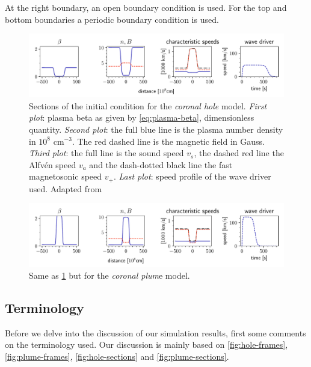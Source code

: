 At the right boundary, an open boundary condition is used. For the top and bottom boundaries a periodic boundary condition is used.

\begin{figure}[H]
	\centering
	\includegraphics[width=.9\linewidth]{images/sections-initial-condition-hole.pdf}
	\caption{Sections of the initial condition for the \emph{coronal hole} model. 
		\emph{First plot}: plasma beta as given by \cref{eq:plasma-beta}, dimensionless quantity.
		\emph{Second plot}: the full blue line is the plasma number density in $10^8$ cm$^{-3}$.
The red dashed line is the magnetic field in Gauss.
\emph{Third plot}: the full line is the sound speed $v_s$, the dashed red line the Alfvén speed $v_a$ and the dash-dotted black line the fast magnetosonic speed $v_+$.
\emph{Last plot}: speed profile of the wave driver used.
Adapted from \cite{coronal-hole}}
	\label{fig:hole-initial}
\end{figure}

\begin{figure}[H]
	\centering
	\includegraphics[width=.9\linewidth]{images/sections-initial-condition-plume.pdf}
	\caption{Same as \cref{fig:hole-initial} but for the \emph{coronal plum}e model.}
	\label{fig:plume-initial}
\end{figure}

\newpage
\subsection{Terminology}
Before we delve into the discussion of our simulation results, first some comments on the terminology used.
Our discussion is mainly based on \cref{fig:hole-frames}, \cref{fig:plume-frames}, \cref{fig:hole-sections} and \cref{fig:plume-sections}.

